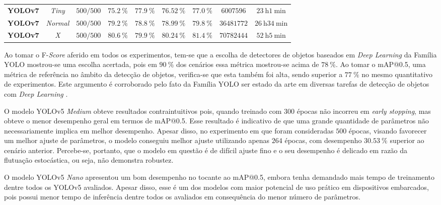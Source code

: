 \begin{table}[h!]
\begin{footnotesize}
\begin{tabular}{ccccccccc}
\midrule
\textbf{YOLOv7} &  \emph{Tiny} & $500/500$ & $\SI{75,2}{\percent}$ & $\SI{77,9}{\percent}$ & $\SI{76,52}{\percent}$ & $\SI{77,0}{\percent}$ & $\num{6007596}$ & $\SI{23}{\hour}\SI{1}{\minute}$\\
\textbf{YOLOv7}  & \emph{Normal} & $500/500$ & $\SI{79,2}{\percent}$ & $\SI{78,8}{\percent}$ & $\SI{78,99}{\percent}$ & $\SI{79,8}{\percent}$ & $\num{36481772}$ & $\SI{26}{\hour}\SI{34}{\minute}$\\
\textbf{YOLOv7} & \emph{X} & $500/500$ & $\SI{80,6}{\percent}$ & $\SI{79,9}{\percent}$ & $\SI{80,24}{\percent}$ & $\SI{81,4}{\percent}$ & $\num{70782444}$ & $\SI{52}{\hour}\SI{5}{\minute}$\\
\bottomrule
\end{tabular}
\end{footnotesize}
\end{table}

Ao tomar o F-\emph{Score} aferido em todos os experimentos, tem-se que a escolha de detectores de objetos baseados em \emph{Deep Learning} da Família YOLO mostrou-se uma escolha acertada, pois em $\SI{90}{\percent}$ dos cenários essa métrica mostrou-se acima de $\SI{78}{\percent}$. Ao tomar o mAP@0.5, uma métrica de referência no âmbito da detecção de objetos, verifica-se que esta também foi alta, sendo superior a $\SI{77}{\percent}$ no mesmo quantitativo de experimentos. Este argumento é corroborado pelo fato da Família YOLO ser estado da arte em diversas tarefas de detecção de objetos com \emph{Deep Learning} \cite{Sumit:YOLO}.

O modelo YOLOv5 \emph{Medium} obteve resultados contraintuitivos pois, quando treinado com $300$ épocas não incorreu em \emph{early stopping}, mas obteve o menor desempenho geral em termos de mAP@0.5. Esse resultado é indicativo de que uma grande quantidade de parâmetros não necessariamente implica em melhor desempenho. Apesar disso, no experimento em que foram consideradas $500$ épocas, visando favorecer um melhor ajuste de parâmetros, o modelo conseguiu melhor ajuste utilizando apenas $264$ épocas, com desempenho $\SI{30.53}{\percent}$ superior ao cenário anterior. Percebe-se, portanto, que o modelo em questão é de difícil ajuste fino e o seu desempenho é delicado em razão da flutuação estocástica, ou seja, não demonstra robustez.

O modelo YOLOv5 \emph{Nano} apresentou um bom desempenho no tocante ao mAP@0.5, embora tenha demandado mais tempo de treinamento dentre todos os YOLOv5 avaliados. Apesar disso,  esse é um dos modelos com maior potencial de uso prático em dispositivos embarcados, pois possui menor tempo de inferência dentre todos os avaliados em consequência do menor número de parâmetros.

